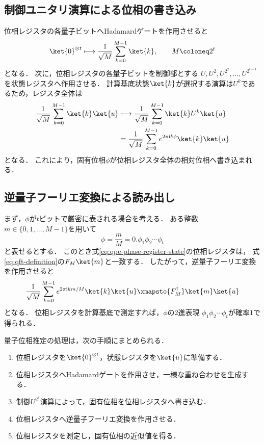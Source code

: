 \subsection{制御ユニタリ演算による位相の書き込み}
\label{subsec:qpe-controlled-unitaries}

位相レジスタの各量子ビットへHadamardゲートを作用させると
\begin{align*}
  \ket{0}^{\otimes t}
  \longmapsto
  \frac{1}{\sqrt{M}}
  \sum_{k=0}^{M-1}\ket{k},
  \qquad
  M\coloneq2^t
\end{align*}
となる．
次に，位相レジスタの各量子ビットを制御部とする
$U,U^2,U^{2^2},\ldots,U^{2^{t-1}}$を状態レジスタへ作用させる．
計算基底状態$\ket{k}$が選択する演算は$U^k$であるため，レジスタ全体は
\begin{align}
  \frac{1}{\sqrt{M}}
  \sum_{k=0}^{M-1}\ket{k}\ket{u}
  &\longmapsto
  \frac{1}{\sqrt{M}}
  \sum_{k=0}^{M-1}\ket{k}U^k\ket{u}\notag\\
  &=
  \frac{1}{\sqrt{M}}
  \sum_{k=0}^{M-1}
  e^{2\pi\mathrm{i}k\phi}\ket{k}\ket{u}
  \label{eq:qpe-phase-register-state}
\end{align}
となる．
これにより，固有位相$\phi$が位相レジスタ全体の相対位相へ書き込まれる．

\subsection{逆量子フーリエ変換による読み出し}
\label{subsec:qpe-inverse-qft-readout}

まず，$\phi$が$t$ビットで厳密に表される場合を考える．
ある整数$m\in\{0,1,\ldots,M-1\}$を用いて
\begin{equation}
  \phi
  =
  \frac{m}{M}
  =
  0.\phi_1\phi_2\cdots\phi_t
  \label{eq:qpe-exact-binary-phase}
\end{equation}
と表せるとする．
このとき式\eqref{eq:qpe-phase-register-state}の位相レジスタは，
式\eqref{eq:qft-definition}の$F_M\ket{m}$と一致する．
したがって，逆量子フーリエ変換を作用させると
\begin{equation}
  \frac{1}{\sqrt{M}}
  \sum_{k=0}^{M-1}e^{2\pi\mathrm{i}km/M}\ket{k}\ket{u}
  \xmapsto{F_M^{\dagger}}
  \ket{m}\ket{u}
  \label{eq:qpe-exact-output}
\end{equation}
となる．
位相レジスタを計算基底で測定すれば，$\phi$の2進表現
$\phi_1\phi_2\cdots\phi_t$が確率$1$で得られる．

量子位相推定の処理は，次の手順にまとめられる．

\begin{enumerate}[(1)]
  \item 位相レジスタを$\ket{0}^{\otimes t}$，状態レジスタを$\ket{u}$に準備する．
  \item 位相レジスタへHadamardゲートを作用させ，一様な重ね合わせを生成する．
  \item 制御$U^{2^r}$演算によって，固有位相を位相レジスタへ書き込む．
  \item 位相レジスタへ逆量子フーリエ変換を作用させる．
  \item 位相レジスタを測定し，固有位相の近似値を得る．
\end{enumerate}

